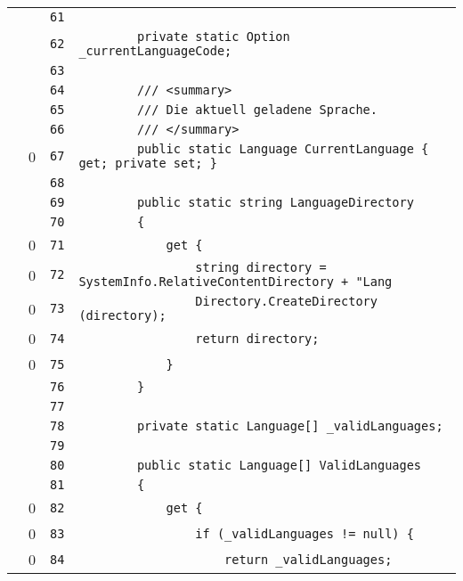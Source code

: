 \documentclass[a4paper,10pt]{article}
\begin{document}
\begin{longtable}[l]{lrrl}
\cellcolor{gray} &  & \verb~61~ & \verb~~\\
\cellcolor{gray} &  & \verb~62~ & \verb~        private static Option _currentLanguageCode;~\\
\cellcolor{gray} &  & \verb~63~ & \verb~~\\
\cellcolor{gray} &  & \verb~64~ & \verb~        /// <summary>~\\
\cellcolor{gray} &  & \verb~65~ & \verb~        /// Die aktuell geladene Sprache.~\\
\cellcolor{gray} &  & \verb~66~ & \verb~        /// </summary>~\\
\cellcolor{red} & 0 & \verb~67~ & \verb~        public static Language CurrentLanguage { get; private set; }~\\
\cellcolor{gray} &  & \verb~68~ & \verb~~\\
\cellcolor{gray} &  & \verb~69~ & \verb~        public static string LanguageDirectory~\\
\cellcolor{gray} &  & \verb~70~ & \verb~        {~\\
\cellcolor{red} & 0 & \verb~71~ & \verb~            get {~\\
\cellcolor{red} & 0 & \verb~72~ & \verb~                string directory = SystemInfo.RelativeContentDirectory + "Lang~\\
\cellcolor{red} & 0 & \verb~73~ & \verb~                Directory.CreateDirectory (directory);~\\
\cellcolor{red} & 0 & \verb~74~ & \verb~                return directory;~\\
\cellcolor{red} & 0 & \verb~75~ & \verb~            }~\\
\cellcolor{gray} &  & \verb~76~ & \verb~        }~\\
\cellcolor{gray} &  & \verb~77~ & \verb~~\\
\cellcolor{gray} &  & \verb~78~ & \verb~        private static Language[] _validLanguages;~\\
\cellcolor{gray} &  & \verb~79~ & \verb~~\\
\cellcolor{gray} &  & \verb~80~ & \verb~        public static Language[] ValidLanguages~\\
\cellcolor{gray} &  & \verb~81~ & \verb~        {~\\
\cellcolor{red} & 0 & \verb~82~ & \verb~            get {~\\
\cellcolor{red} & 0 & \verb~83~ & \verb~                if (_validLanguages != null) {~\\
\cellcolor{red} & 0 & \verb~84~ & \verb~                    return _validLanguages;~\\

\end{longtable}
\end{document}
